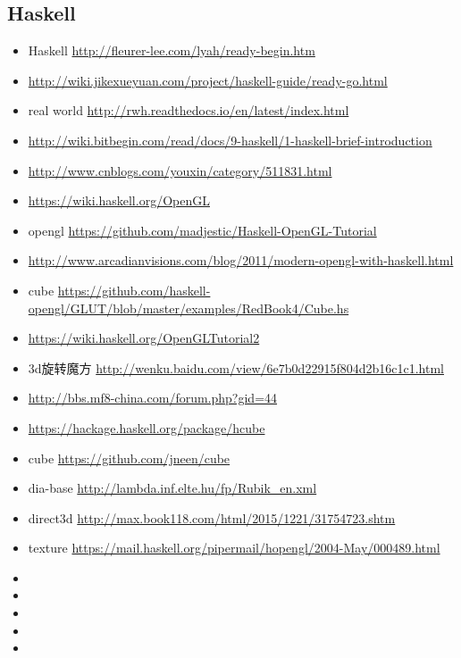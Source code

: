 \documentclass[9pt,b5paper]{article}
\begin{document}
\subsection{Haskell}
\label{sec-2-1}
\begin{itemize}
\item Haskell \url{http://fleurer-lee.com/lyah/ready-begin.htm}
\item \url{http://wiki.jikexueyuan.com/project/haskell-guide/ready-go.html}
\item real world \url{http://rwh.readthedocs.io/en/latest/index.html}
\item \url{http://wiki.bitbegin.com/read/docs/9-haskell/1-haskell-brief-introduction}
\item \url{http://www.cnblogs.com/youxin/category/511831.html}
\item \url{https://wiki.haskell.org/OpenGL}
\item opengl \url{https://github.com/madjestic/Haskell-OpenGL-Tutorial}
\item \url{http://www.arcadianvisions.com/blog/2011/modern-opengl-with-haskell.html}
\item cube \url{https://github.com/haskell-opengl/GLUT/blob/master/examples/RedBook4/Cube.hs}
\item \url{https://wiki.haskell.org/OpenGLTutorial2}
\item 3d旋转魔方 \url{http://wenku.baidu.com/view/6e7b0d22915f804d2b16c1c1.html}
\item \url{http://bbs.mf8-china.com/forum.php?gid=44}
\item \url{https://hackage.haskell.org/package/hcube}
\item cube \url{https://github.com/jneen/cube}
\item dia-base \url{http://lambda.inf.elte.hu/fp/Rubik_en.xml}
\item direct3d \url{http://max.book118.com/html/2015/1221/31754723.shtm}
\item texture \url{https://mail.haskell.org/pipermail/hopengl/2004-May/000489.html}
\item 
\item 
\item 
\item 
\item 
\end{itemize}
\end{document}
